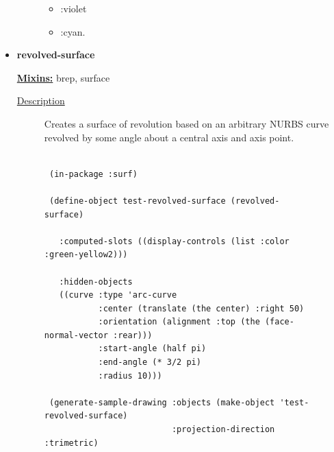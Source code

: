 \documentclass [11pt]{book}
\begin{document}
\begin{itemize}
\begin{description}
\begin{itemize}
\item  :violet 

\item  :cyan. 

\end{itemize}





\end{description}







\item {}
\label{prim:revolved-surface}
\textbf{revolved-surface}


\textbf{
\underline{Mixins:}} brep, surface





\begin{description}

\item [
\underline{Description}]


Creates a surface of revolution based on an arbitrary NURBS curve revolved by some angle about
a central axis and axis point.



\end{description}




\begin{figure}
\begin{lrbox}{\boxedverb}
\begin{minipage}{\linewidth}
{\small

\begin{verbatim}

 (in-package :surf)

 (define-object test-revolved-surface (revolved-surface)

   :computed-slots ((display-controls (list :color :green-yellow2)))

   :hidden-objects 
   ((curve :type 'arc-curve
           :center (translate (the center) :right 50)
           :orientation (alignment :top (the (face-normal-vector :rear)))
           :start-angle (half pi)
           :end-angle (* 3/2 pi)
           :radius 10)))
 
 (generate-sample-drawing :objects (make-object 'test-revolved-surface)
                          :projection-direction :trimetric)
 
 
\end{verbatim}}
\end{minipage}
\end{lrbox}
\fbox{\usebox{\boxedverb}}


\end{figure}
\end{itemize}
\end{document}
